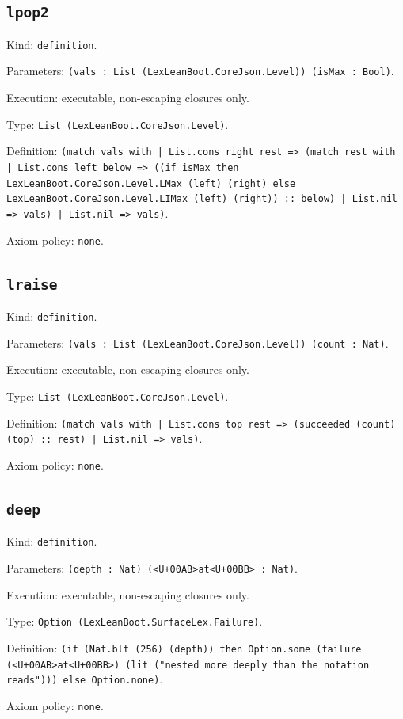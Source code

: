 \documentclass[11pt]{article}
\begin{document}
\subsection*{\texttt{lpop2}}
\noindent Kind: \texttt{definition}.\par
\noindent Parameters: \texttt{(vals : List (LexLeanBoot.CoreJson.Level)) (isMax : Bool)}.\par
\noindent Execution: executable, non-escaping closures only.\par
\noindent Type: \texttt{List (LexLeanBoot.CoreJson.Level)}.\par
\noindent Definition: \texttt{(match vals with | List.cons right rest => (match rest with | List.cons left below => ((if isMax then LexLeanBoot.CoreJson.Level.LMax (left) (right) else LexLeanBoot.CoreJson.Level.LIMax (left) (right)) :: below) | List.nil => vals) | List.nil => vals)}.\par
\noindent Axiom policy: \texttt{none}.\par
\subsection*{\texttt{lraise}}
\noindent Kind: \texttt{definition}.\par
\noindent Parameters: \texttt{(vals : List (LexLeanBoot.CoreJson.Level)) (count : Nat)}.\par
\noindent Execution: executable, non-escaping closures only.\par
\noindent Type: \texttt{List (LexLeanBoot.CoreJson.Level)}.\par
\noindent Definition: \texttt{(match vals with | List.cons top rest => (succeeded (count) (top) :: rest) | List.nil => vals)}.\par
\noindent Axiom policy: \texttt{none}.\par
\subsection*{\texttt{deep}}
\noindent Kind: \texttt{definition}.\par
\noindent Parameters: \texttt{(depth : Nat) (<U+00AB>at<U+00BB> : Nat)}.\par
\noindent Execution: executable, non-escaping closures only.\par
\noindent Type: \texttt{Option (LexLeanBoot.SurfaceLex.Failure)}.\par
\noindent Definition: \texttt{(if (Nat.blt (256) (depth)) then Option.some (failure (<U+00AB>at<U+00BB>) (lit ("nested more deeply than the notation reads"))) else Option.none)}.\par
\noindent Axiom policy: \texttt{none}.\par
\end{document}
